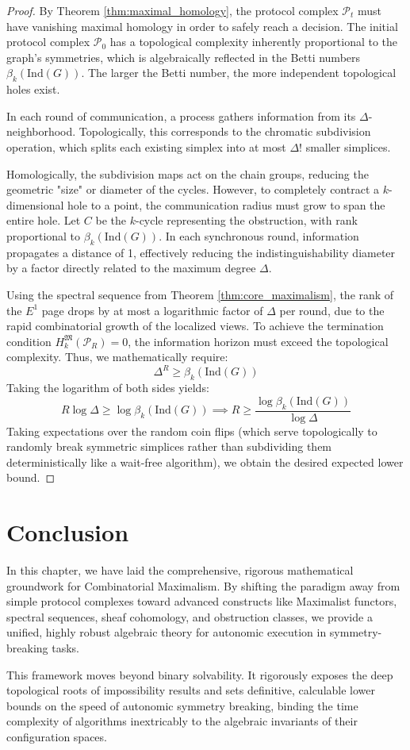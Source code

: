 \begin{proof}
By Theorem \ref{thm:maximal_homology}, the protocol complex $\mathcal{P}_t$ must have vanishing maximal homology in order to safely reach a decision. The initial protocol complex $\mathcal{P}_0$ has a topological complexity inherently proportional to the graph's symmetries, which is algebraically reflected in the Betti numbers $\beta_k(\text{Ind}(G))$. The larger the Betti number, the more independent topological holes exist.

In each round of communication, a process gathers information from its $\Delta$-neighborhood. Topologically, this corresponds to the chromatic subdivision operation, which splits each existing simplex into at most $\Delta!$ smaller simplices.

Homologically, the subdivision maps act on the chain groups, reducing the geometric "size" or diameter of the cycles. However, to completely contract a $k$-dimensional hole to a point, the communication radius must grow to span the entire hole. 
Let $C$ be the $k$-cycle representing the obstruction, with rank proportional to $\beta_k(\text{Ind}(G))$. In each synchronous round, information propagates a distance of 1, effectively reducing the indistinguishability diameter by a factor directly related to the maximum degree $\Delta$.

Using the spectral sequence from Theorem \ref{thm:core_maximalism}, the rank of the $E^1$ page drops by at most a logarithmic factor of $\Delta$ per round, due to the rapid combinatorial growth of the localized views.
To achieve the termination condition $H_k^{\mathfrak{M}}(\mathcal{P}_R) = 0$, the information horizon must exceed the topological complexity. Thus, we mathematically require:
\[
\Delta^R \ge \beta_k(\text{Ind}(G))
\]
Taking the logarithm of both sides yields:
\[
R \log \Delta \ge \log \beta_k(\text{Ind}(G)) \implies R \ge \frac{\log \beta_k(\text{Ind}(G))}{\log \Delta}
\]
Taking expectations over the random coin flips (which serve topologically to randomly break symmetric simplices rather than subdividing them deterministically like a wait-free algorithm), we obtain the desired expected lower bound.
\end{proof}

\section{Conclusion}

In this chapter, we have laid the comprehensive, rigorous mathematical groundwork for Combinatorial Maximalism. By shifting the paradigm away from simple protocol complexes toward advanced constructs like Maximalist functors, spectral sequences, sheaf cohomology, and obstruction classes, we provide a unified, highly robust algebraic theory for autonomic execution in symmetry-breaking tasks. 

This framework moves beyond binary solvability. It rigorously exposes the deep topological roots of impossibility results and sets definitive, calculable lower bounds on the speed of autonomic symmetry breaking, binding the time complexity of algorithms inextricably to the algebraic invariants of their configuration spaces.